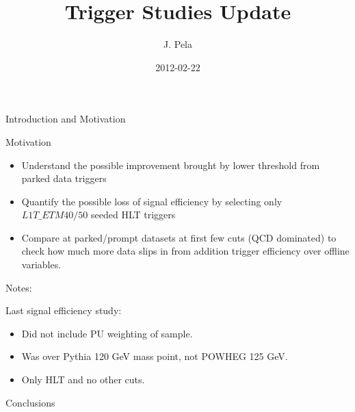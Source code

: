 \documentclass[8pt]{beamer}
\author[João Pela]{J. Pela}
\title[]{Trigger Studies Update}
\institute{Imperial College London}
\date{2012-02-22}
\begin{document}
\setlength{\unitlength}{1mm}

\begin{frame}
  \titlepage
\end{frame}

\begin{frame}{Introduction and Motivation}

\begin{block}{Motivation}

  \begin{itemize}
    \item Understand the possible improvement brought by lower threshold from parked data triggers
    \item Quantify the possible loss of signal efficiency by selecting only $L1T\_ETM{40/50}$ seeded HLT triggers
    \item Compare at parked/prompt datasets at first few cuts (QCD dominated) to check how much more data slips in from addition trigger efficiency
          over offline variables.
  \end{itemize}
  
\end{block}

\begin{block}{Notes:}

  Last signal efficiency study:
  \begin{itemize}
    \item Did not include PU weighting of sample.
    \item Was over Pythia 120 GeV mass point, not POWHEG 125 GeV.
    \item Only HLT and no other cuts.
  \end{itemize}
  
\end{block}

\end{frame}

\begin{frame}{}


\end{frame}

\begin{frame}{Conclusions}


\end{frame}
\end{document}

